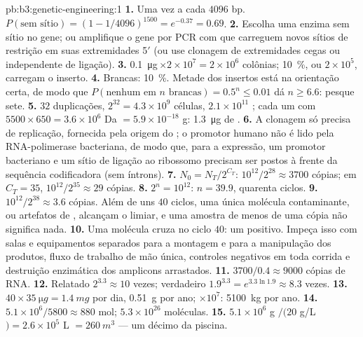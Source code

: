 \begin{solution}{pb:b3:genetic-engineering:1}
\textbf{1.} Uma vez a cada $4096$ bp. $P(\text{sem sítio}) = (1 - 1/4096)^{1500}
= e^{-0.37} = 0.69$.
\textbf{2.} Escolha uma enzima sem sítio no gene; ou amplifique o gene
por PCR com  que carreguem novos sítios de restrição em suas
extremidades 5$'$ (ou use clonagem de extremidades cegas ou
independente de ligação).
\textbf{3.} \qty{0.1}{\micro g}\,$\times 2\times 10^{7} = 2\times
10^{6}$ colônias; \qty{10}{\%}, ou $2\times 10^{5}$, carregam o
inserto.
\textbf{4.} Brancas: \qty{10}{\%}. Metade dos insertos está na
orientação certa, de modo que $P(\text{nenhum em } n \text{ brancas}) = 0.5^{n} \le 0.01$ dá $n \ge 6.6$: pesque sete.
\textbf{5.} $32$ duplicações, $2^{32} = 4.3\times 10^{9}$ células,
$2.1\times
10^{11}$ ; cada um com $5500\times 650 = 3.6\times 10^{6}$ Da $=
5.9\times 10^{-18}$ g: \qty{1.3}{\micro g} de
.
\textbf{6.} A clonagem só precisa de replicação, fornecida pela origem
do ; o promotor humano não é lido pela RNA-polimerase
bacteriana, de modo que, para a expressão, um promotor bacteriano e um
sítio de ligação ao ribossomo precisam ser postos à frente da sequência
codificadora (sem íntrons).
\textbf{7.} $N_{0} = N_{T}/2^{C_{T}}$: $10^{12}/2^{28} \approx 3700$
cópias; em $C_{T} = 35$, $10^{12}/2^{35} \approx 29$ cópias.
\textbf{8.} $2^{n} = 10^{12}$: $n = 39.9$, quarenta ciclos.
\textbf{9.} $10^{12}/2^{38} \approx 3.6$ cópias. Além de uns $40$
ciclos, uma única molécula contaminante, ou artefatos de ,
alcançam o limiar, e uma amostra de menos de uma cópia não significa
nada.
\textbf{10.} Uma molécula cruza no ciclo $40$: um positivo. Impeça isso
com salas e equipamentos separados para a montagem e para a manipulação
dos produtos, fluxo de trabalho de mão única, controles negativos em
toda corrida e destruição enzimática dos amplicons arrastados.
\textbf{11.} $3700/0.4 \approx 9000$ cópias de RNA.
\textbf{12.} Relatado $2^{3.3} \approx 10$ vezes; verdadeiro
$1.9^{3.3} =
e^{3.3\ln 1.9} \approx 8.3$ vezes.
\textbf{13.} $40\times \qty{35}{\micro g} = \qty{1.4}{mg}$ por dia,
\qty{0.51}{g} por ano; $\times 10^{7}$: \qty{5100}{kg} por ano.
\textbf{14.} $5.1\times 10^{6}/5800 \approx 880$ mol; $5.3\times 10^{26}$
moléculas.
\textbf{15.} $5.1\times 10^{6}$ g $/ (20$ g/L$) = 2.6\times 10^{5}$ L
$= \qty{260}{m^3}$ --- um décimo da piscina.

\end{solution}
